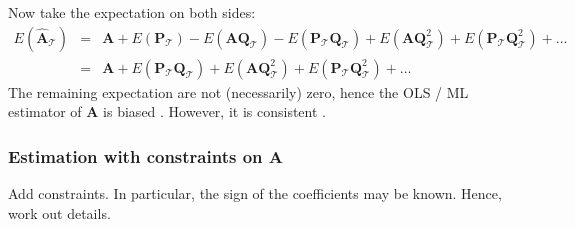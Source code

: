 \documentclass[a4paper]{article}
\theoremstyle{myexamplestyle}
\begin{document}
Now take the expectation on both sides:
\begin{eqnarray*}
E( \hat{\mathbf{A}}_{\mathcal{T}} ) & = &  \mathbf{A} + E(\mathbf{P}_{\mathcal{T}}) - E(\mathbf{A} \mathbf{Q}_{\mathcal{T}} )  - E(\mathbf{P}_{\mathcal{T}} \mathbf{Q}_{\mathcal{T}})  + E(\mathbf{A} \mathbf{Q}_{\mathcal{T}}^2)   + E(\mathbf{P}_{\mathcal{T}} \mathbf{Q}_{\mathcal{T}}^2)  + \ldots
\\
& = &  \mathbf{A} + E(\mathbf{P}_{\mathcal{T}} \mathbf{Q}_{\mathcal{T}})  + E(\mathbf{A} \mathbf{Q}_{\mathcal{T}}^2)   + E(\mathbf{P}_{\mathcal{T}} \mathbf{Q}_{\mathcal{T}}^2)  + \ldots
\end{eqnarray*}
The remaining expectation are not (necessarily) zero, hence the OLS / ML estimator of $\mathbf{A}$ is biased \citep{Nich1988}. However, it is consistent \citep{Luet2005}.

\subsubsection{Estimation with constraints on $\mathbf{A}$}
Add constraints. In particular, the sign of the coefficients may be known. Hence, work out details.
\end{document}
